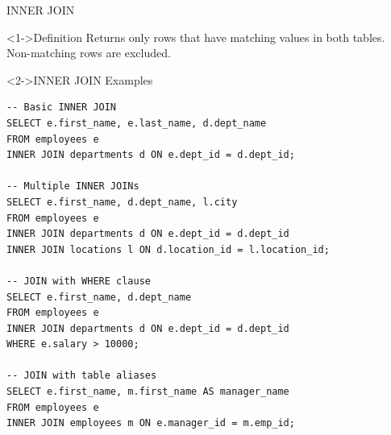 \documentclass[aspectratio=169,11pt]{beamer}
\begin{document}
\begin{frame}[fragile]{INNER JOIN}
\begin{block}<1->{Definition}
Returns only rows that have matching values in both tables. Non-matching rows are excluded.
\end{block}

\pause
\begin{exampleblock}<2->{INNER JOIN Examples}
\begin{lstlisting}
-- Basic INNER JOIN
SELECT e.first_name, e.last_name, d.dept_name
FROM employees e
INNER JOIN departments d ON e.dept_id = d.dept_id;

-- Multiple INNER JOINs
SELECT e.first_name, d.dept_name, l.city
FROM employees e
INNER JOIN departments d ON e.dept_id = d.dept_id
INNER JOIN locations l ON d.location_id = l.location_id;

-- JOIN with WHERE clause
SELECT e.first_name, d.dept_name
FROM employees e
INNER JOIN departments d ON e.dept_id = d.dept_id
WHERE e.salary > 10000;

-- JOIN with table aliases
SELECT e.first_name, m.first_name AS manager_name
FROM employees e
INNER JOIN employees m ON e.manager_id = m.emp_id;
\end{lstlisting}
\end{exampleblock}
\end{frame}
\end{document}
